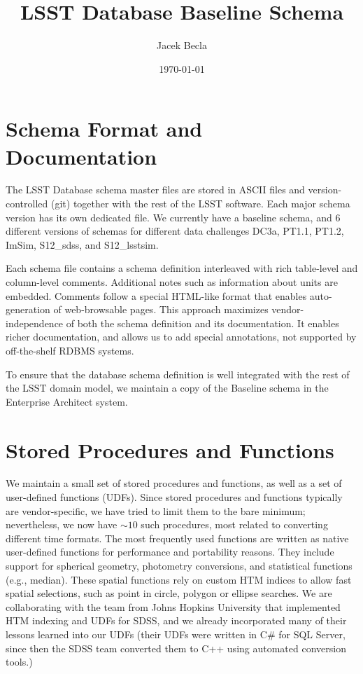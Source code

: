\documentclass[DM,toc]{lsstdoc}
\title{LSST Database Baseline Schema}
\author{%
Jacek Becla
}
\date{\today}
\begin{document}
\maketitle

\section{Schema Format and Documentation}

The LSST Database schema master files are stored in ASCII files and version-controlled (git) together with the rest of the LSST software. Each major schema version has its own dedicated file. We currently have a baseline schema, and 6 different versions of schemas for different data challenges DC3a, PT1.1, PT1.2, ImSim, S12\_sdss, and S12\_lsstsim.

Each schema file contains a schema definition interleaved with rich table-level and column-level comments. Additional notes such as information about units are embedded. Comments follow a special HTML-like format that enables auto-generation of web-browsable pages. This approach maximizes vendor-independence of both the schema definition and its documentation. It enables richer documentation, and allows us to add special annotations, not supported by off-the-shelf RDBMS systems.

To ensure that the database schema definition is well integrated with the rest of the LSST domain model, we maintain a copy of the Baseline schema in the Enterprise Architect system.

\section{Stored Procedures and Functions}

We maintain a small set of stored procedures and functions, as well as a set of user-defined functions (UDFs). Since stored procedures and functions typically are vendor-specific, we have tried to limit them to the bare minimum; nevertheless, we now have $\sim10$ such procedures, most related to converting different time formats. The most frequently used functions are written as native user-defined functions for performance and portability reasons. They include support for spherical geometry, photometry conversions, and statistical functions (e.g., median). These spatial functions rely on custom HTM indices to allow fast spatial selections, such as point in circle, polygon or ellipse searches. We are collaborating with the team from Johns Hopkins University that implemented HTM indexing and UDFs for SDSS, and we already incorporated many of their lessons learned into our UDFs (their UDFs were written in C\# for SQL Server, since then the SDSS team converted them to C++ using automated conversion tools.)
\end{document}
